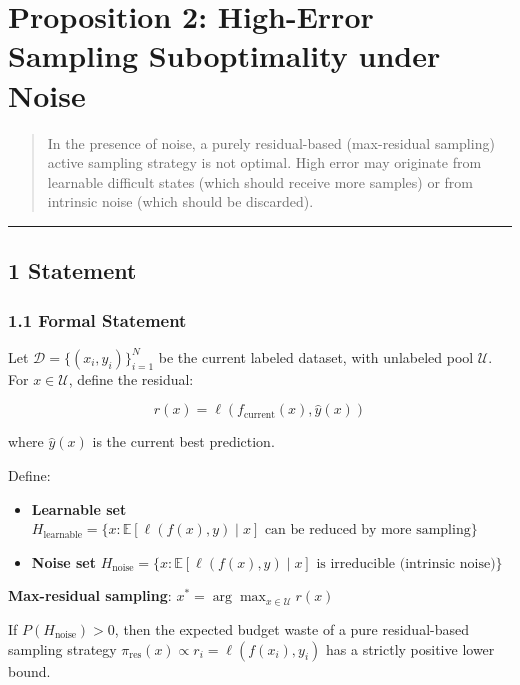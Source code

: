 \documentclass[
  12pt,
]{article}
\author{SCX}
\date{2026}
\providecommand{\tightlist}{%
  \setlength{\itemsep}{0pt}\setlength{\parskip}{0pt}}
\begin{document}
\section{Proposition 2: High-Error Sampling Suboptimality under
Noise}\label{proposition-2-high-error-sampling-suboptimality-under-noise}

\begin{quote}
In the presence of noise, a purely residual-based (max-residual sampling) active sampling strategy is not optimal. High error may originate from learnable difficult states (which should receive more samples) or from intrinsic noise (which should be discarded).
\end{quote}

\begin{center}\rule{0.5\linewidth}{0.5pt}\end{center}

\subsection{1 Statement}\label{statement}

\subsubsection{1.1 Formal Statement}\label{formal-statement}

Let \(\mathcal{D} = \{(x_i, y_i)\}_{i=1}^N\) be the current labeled dataset, with unlabeled pool
\(\mathcal{U}\). For \(x \in \mathcal{U}\), define the residual:

\[r(x) = \ell(f_{\text{current}}(x), \hat{y}(x))\]

where \(\hat{y}(x)\) is the current best prediction.

Define:

\begin{itemize}
\tightlist
\item
  \textbf{Learnable set}
  \(H_{\text{learnable}} = \{x: \mathbb{E}[\ell(f(x), y) \mid x] \text{ can be reduced by more sampling}\}\)
\item
  \textbf{Noise set}
  \(H_{\text{noise}} = \{x: \mathbb{E}[\ell(f(x), y) \mid x] \text{ is irreducible (intrinsic noise)}\}\)
\end{itemize}

\textbf{Max-residual sampling}: \(x^* = \arg\max_{x \in \mathcal{U}} r(x)\)

If \(P(H_{\text{noise}}) > 0\), then the expected budget waste of a pure residual-based sampling strategy
\(\pi_{\text{res}}(x) \propto r_i = \ell(f(x_i), y_i)\)
has a strictly positive lower bound.
\end{document}
